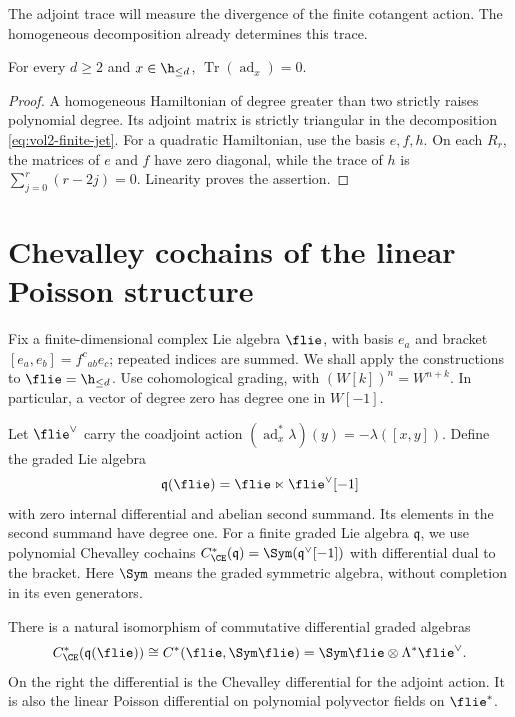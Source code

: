 The adjoint trace will measure the divergence of the finite cotangent
action. The homogeneous decomposition already determines this trace.

\begin{proposition}[Unimodularity]\label{prop:vol2-jet-unimodular}
For every $d\geq2$ and $x\in\h_{\leq d}$,
$\operatorname{Tr}(\operatorname{ad}_x)=0$.
\end{proposition}

\begin{proof}
A homogeneous Hamiltonian of degree greater than two strictly raises
polynomial degree. Its adjoint matrix is strictly triangular in the
decomposition \eqref{eq:vol2-finite-jet}. For a quadratic Hamiltonian,
use the basis $e,f,h$. On each $R_r$, the matrices of $e$ and $f$ have
zero diagonal, while the trace of $h$ is
$\sum_{j=0}^r(r-2j)=0$. Linearity proves the assertion.
\end{proof}

\section{Chevalley cochains of the linear Poisson structure}

Fix a finite-dimensional complex Lie algebra $\flie$, with basis
$e_a$ and bracket $[e_a,e_b]=f^c{}_{ab}e_c$; repeated indices are
summed. We shall apply the constructions to $\flie=\h_{\leq d}$.
Use cohomological grading, with $(W[k])^n=W^{n+k}$.
In particular, a vector of degree zero has degree one in $W[-1]$.

Let $\flie^\vee$ carry the coadjoint action
$(\operatorname{ad}_x^*\lambda)(y)=-\lambda([x,y])$.
Define the graded Lie algebra
\[
 \mathfrak q(\flie)=\flie\ltimes\flie^\vee[-1]
\]
with zero internal differential and abelian second summand.
Its elements in the second summand have degree one.
For a finite graded Lie algebra $\mathfrak q$, we use polynomial
Chevalley cochains
$C^*_{\CE}(\mathfrak q)=\Sym(\mathfrak q^\vee[-1])$
with differential dual to the bracket. Here $\Sym$ means the graded
symmetric algebra, without completion in its even generators.

\begin{proposition}\label{prop:vol2-ce-poisson}
There is a natural isomorphism of commutative differential graded
algebras
\[
 C^*_{\CE}(\mathfrak q(\flie))
 \cong C^*(\flie,\Sym\flie)
 =\Sym\flie\otimes\Lambda^*\flie^\vee.
\]
On the right the differential is the Chevalley differential for the
adjoint action. It is also the linear Poisson differential on
polynomial polyvector fields on $\flie^*$.
\end{proposition}

